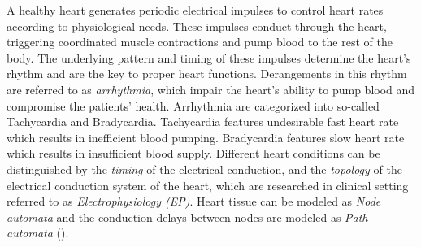 A healthy heart generates periodic electrical impulses to control heart rates according to physiological needs. These impulses conduct through the heart, triggering coordinated muscle contractions and pump blood to the rest of the body. The underlying pattern and timing of these impulses determine the heart's rhythm and are the key to proper heart functions. Derangements in this rhythm are referred to as \emph{arrhythmia}, which impair the heart's ability to pump blood and compromise the patients' health. Arrhythmia are categorized into so-called \textsf{Tachycardia} and \textsf{Bradycardia}. Tachycardia features undesirable fast heart rate which results in inefficient blood pumping. Bradycardia features slow heart rate which results in insufficient blood supply. Different heart conditions can be distinguished by the \emph{timing} of the electrical conduction, and the \emph{topology} of the electrical conduction system of the heart, which are researched in clinical setting referred to as \emph{Electrophysiology (EP)}\cite{josephson}. Heart tissue can be modeled as \emph{Node automata} and the conduction delays between nodes are modeled as \emph{Path automata} (). 



%
 
